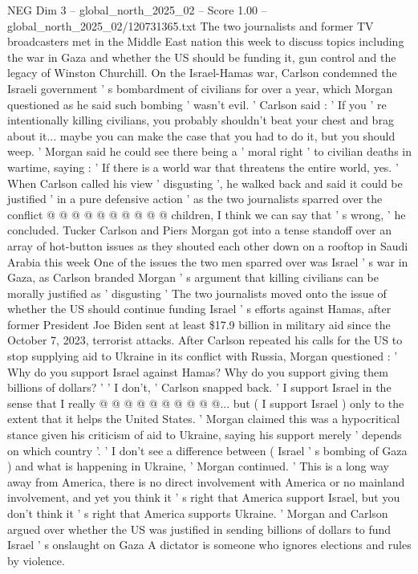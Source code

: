 \begin{textsample}{NEG Dim 3 – global\_north\_2025\_02 – Score 1.00 – global\_north\_2025\_02/120731365.txt}  \label{ex:f3_neg_177}
The two journalists and former TV broadcasters met in the Middle East nation this week to discuss topics including the war in Gaza and whether the US should be funding it, gun control and the legacy of Winston Churchill.
On the Israel-Hamas war, Carlson condemned the Israeli government ' s bombardment of civilians for over a year, which Morgan questioned as he said such bombing ' wasn't evil. ' Carlson said : ' If you ' re intentionally killing civilians, you probably shouldn't beat your chest and brag about it... maybe you can make the case that you had to do it, but you should weep. ' Morgan said he could see there being a ' moral right ' to civilian deaths in wartime, saying : ' If there is a world war that threatens the entire world, yes. ' When Carlson called his view ' disgusting ', he walked back and said it could be justified ' in a pure defensive action ' as the two journalists sparred over the conflict @ @ @ @ @ @ @ @ @ @ children, I think we can say that ' s wrong, ' he concluded.
Tucker Carlson and Piers Morgan got into a tense standoff over an array of hot-button issues as they shouted each other down on a rooftop in Saudi Arabia this week One of the issues the two men sparred over was Israel ' s war in Gaza, as Carlson branded Morgan ' s argument that killing civilians can be morally justified as ' disgusting ' The two journalists moved onto the issue of whether the US should continue funding Israel ' s efforts against Hamas, after former President Joe Biden sent at least \$17.9 billion in military aid since the October 7, 2023, terrorist attacks.
After Carlson repeated his calls for the US to stop supplying aid to Ukraine in its conflict with Russia, Morgan questioned : ' Why do you support Israel against Hamas?
Why do you support giving them billions of dollars? ' ' I don't, ' Carlson snapped back. ' I support Israel in the sense that I really @ @ @ @ @ @ @ @ @ @... but ( I support Israel ) only to the extent that it helps the United States. ' Morgan claimed this was a hypocritical stance given his criticism of aid to Ukraine, saying his support merely ' depends on which country '. ' I don't see a difference between ( Israel ' s bombing of Gaza ) and what is happening in Ukraine, ' Morgan continued. ' This is a long way away from America, there is no direct involvement with America or no mainland involvement, and yet you think it ' s right that America support Israel, but you don't think it ' s right that America supports Ukraine. ' Morgan and Carlson argued over whether the US was justified in sending billions of dollars to fund Israel ' s onslaught on Gaza A dictator is someone who ignores elections and rules by violence.

\end{textsample}
